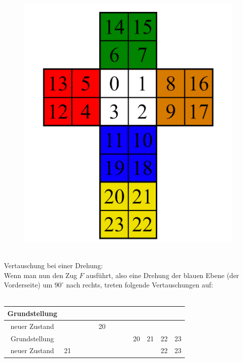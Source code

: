 \documentclass[12pt,a4paper, usenames, dvipsnames]{scrartcl}
\begin{document}
\begin{figure}[h]
\centering
\includegraphics[scale=0.1]{2x2foldedout.png}
\end{figure}
\\
Vertauschung bei einer Drehung: \\
Wenn man nun den Zug $F$ ausführt, also eine Drehung der blauen Ebene (der Vorderseite) um $90^\circ$ nach rechts, treten folgende Vertauschungen auf: \\ \\
\begin{tabular}{|c|c|c|c|c|c|c|c|c|c|c|c|c|}
\hline
Grundstellung & \color{gray}{0} & \color{gray}{1} & \color{gray}{2} & \color{gray}{3} & \color{red}{4} & \color{red}{5} & \color{ForestGreen}{6} & \color{ForestGreen}{7} & \color{orange}{8} & \color{orange}{9} & \color{blue}{10} & \color{blue}{11} \\
\hline
neuer Zustand & \color{gray}{0} & \color{gray}{1} & \color{red}{4} & \color{red}{12} & 20 & \color{red}{5} & \color{ForestGreen}{6} & \color{ForestGreen}{7} & \color{orange}{8} & \color{gray}{3} & \color{blue}{11} & \color{blue}{19} \\
\hline
\hline
Grundstellung & \color{red}{12} & \color{red}{13} & \color{ForestGreen}{14} & \color{ForestGreen}{15} & \color{orange}{16} & \color{orange}{17} & \color{blue}{18} & \color{blue}{19} & 20 & 21 & 22 & 23 \\
\hline
neuer Zustand & 21 & \color{red}{13} & \color{ForestGreen}{14} & \color{ForestGreen}{15} & \color{orange}{16} & \color{gray}{2} & \color{blue}{10} & \color{blue}{19} & \color{orange}{17} & \color{orange}{9} & 22 & 23\\
\hline
\end{tabular} \\
\end{document}
